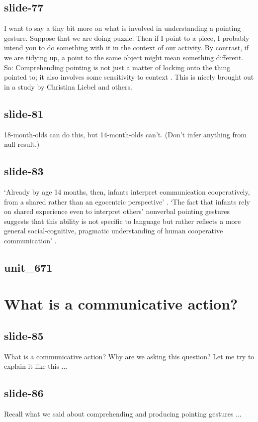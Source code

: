 \documentclass[12pt,\papersize]{extarticle}
\begin{document}
 
\subsection{slide-77}
I want to say a tiny bit more on what is involved in understanding a pointing gesture.
Suppose that we are doing puzzle. Then if I point to a piece, I probably intend you to do something with it in the context of our activity.
By contrast, if we are tidying up, a point to the same object might mean something different.
So:
Comprehending pointing is not just a matter of locking onto the thing pointed to; it also involves some sensitivity to context \citep[see][]{Liebal:2010lr}.
This is nicely brought out in a study by Christina Liebel and others.
 
 
\subsection{slide-81}
18-month-olds can do this, but 14-month-olds can't. (Don't infer anything from null result.)
 
 
\subsection{slide-83}
‘Already by age 14 months, then, infants interpret communication cooperatively, from a shared rather than an egocentric perspective’ \citep[p.\ 269]{Liebal:2010lr}.
‘The fact that infants rely on shared experience even to interpret others’ nonverbal pointing gestures suggests that this ability is not specific to language but rather reflects a more general social-cognitive, pragmatic understanding of human cooperative communication’ \citep[p.\ 270]{Liebal:2010lr}.
 
 
\subsection{unit\_671}
 
\section{What is a communicative action?}
 
 
\subsection{slide-85}
What is a communicative action?
Why are we asking this question?
Let me try to explain it like this ...
 
 
\subsection{slide-86}
Recall what we said about comprehending and producing pointing gestures ...
 
\end{document}
